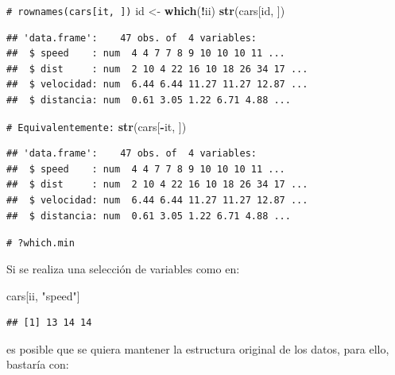 \documentclass[
]{book}
\newenvironment{Shaded}{\begin{snugshade}}{\end{snugshade}}
\newcommand{\CommentTok}[1]{\textcolor[rgb]{0.56,0.35,0.01}{\textit{#1}}}
\newcommand{\FunctionTok}[1]{\textcolor[rgb]{0.13,0.29,0.53}{\textbf{#1}}}
\newcommand{\NormalTok}[1]{#1}
\newcommand{\OtherTok}[1]{\textcolor[rgb]{0.56,0.35,0.01}{#1}}
\newcommand{\SpecialCharTok}[1]{\textcolor[rgb]{0.81,0.36,0.00}{\textbf{#1}}}
\newcommand{\StringTok}[1]{\textcolor[rgb]{0.31,0.60,0.02}{#1}}
\theoremstyle{break}
\theoremstyle{nonumberplain}
\renewcommand{\CommentTok}[1]{\textcolor[rgb]{0.41,0.41,0.41}{\texttt{#1}}}
\begin{document}
\begin{Shaded}
\begin{Highlighting}[]
\CommentTok{\# rownames(cars[it, ])}
\NormalTok{id }\OtherTok{\textless{}{-}} \FunctionTok{which}\NormalTok{(}\SpecialCharTok{!}\NormalTok{ii)}
\FunctionTok{str}\NormalTok{(cars[id, ])}
\end{Highlighting}
\end{Shaded}

\begin{verbatim}
## 'data.frame':    47 obs. of  4 variables:
##  $ speed    : num  4 4 7 7 8 9 10 10 10 11 ...
##  $ dist     : num  2 10 4 22 16 10 18 26 34 17 ...
##  $ velocidad: num  6.44 6.44 11.27 11.27 12.87 ...
##  $ distancia: num  0.61 3.05 1.22 6.71 4.88 ...
\end{verbatim}

\begin{Shaded}
\begin{Highlighting}[]
\CommentTok{\# Equivalentemente:}
\FunctionTok{str}\NormalTok{(cars[}\SpecialCharTok{{-}}\NormalTok{it, ])}
\end{Highlighting}
\end{Shaded}

\begin{verbatim}
## 'data.frame':    47 obs. of  4 variables:
##  $ speed    : num  4 4 7 7 8 9 10 10 10 11 ...
##  $ dist     : num  2 10 4 22 16 10 18 26 34 17 ...
##  $ velocidad: num  6.44 6.44 11.27 11.27 12.87 ...
##  $ distancia: num  0.61 3.05 1.22 6.71 4.88 ...
\end{verbatim}

\begin{Shaded}
\begin{Highlighting}[]
\CommentTok{\# ?which.min}
\end{Highlighting}
\end{Shaded}

Si se realiza una selección de variables como en:

\begin{Shaded}
\begin{Highlighting}[]
\NormalTok{cars[ii, }\StringTok{"speed"}\NormalTok{]}
\end{Highlighting}
\end{Shaded}

\begin{verbatim}
## [1] 13 14 14
\end{verbatim}

es posible que se quiera mantener la estructura original de los datos, para ello,
bastaría con:
\end{document}
